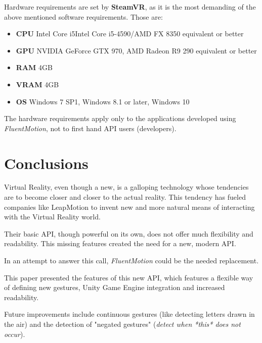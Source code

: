 \documentclass[chi_draft]{sigchi}
\def\fluentmotion{\textit{FluentMotion}}
\def\leap{LeapMotion}
\def\vr{Virtual Reality}
\begin{document}
Hardware requirements are set by \textbf{SteamVR}, as it is the most demanding of the above mentioned software requirements. Those are:

\begin{itemize}
  \item \textbf{CPU} Intel Core i5Intel Core i5-4590/AMD FX 8350 equivalent or better
  \item \textbf{GPU} NVIDIA GeForce GTX 970, AMD Radeon R9 290 equivalent or better
  \item \textbf{RAM} 4GB
  \item \textbf{VRAM} 4GB
  \item \textbf{OS} Windows 7 SP1, Windows 8.1 or later, Windows 10
\end{itemize}

The hardware requirements apply only to the applications developed using \fluentmotion{}, not to first hand API users (developers).

\section{Conclusions}
\vr{}, even though a new, is a galloping technology whose tendencies are to become closer and closer to the actual reality. This tendency has fueled companies like \leap{} to invent new and more natural means of interacting with the \vr{} world.


Their basic API, though powerful on its own, does not offer much flexibility and readability. This missing features created the need for a new, modern API.

In an attempt to answer this call, \fluentmotion{} could be the needed replacement.

This paper presented the features of this new API, which features a flexible way of defining new gestures, Unity Game Engine integration and increased readability.

Future improvements include continuous gestures (like detecting letters drawn in the air) and the detection of "negated gestures" (\textit{detect when *this* does not occur}).

\balance{}



\end{document}
